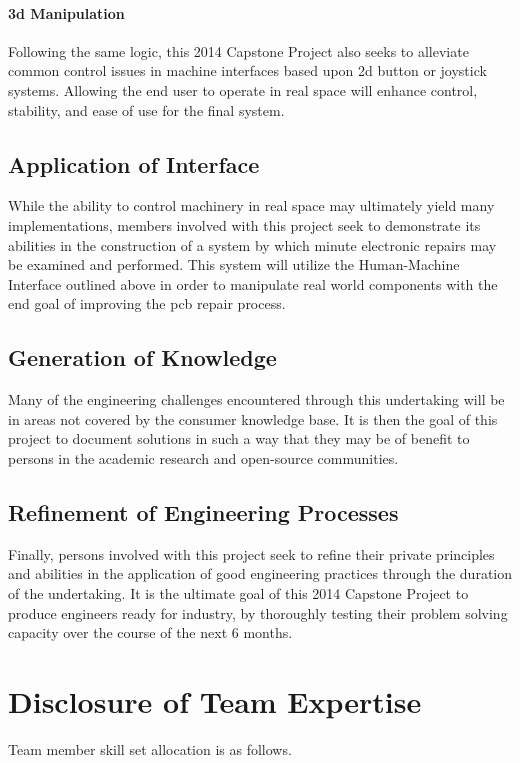 \paragraph{\gls{3d} Manipulation}
Following the same logic, this 2014 Capstone Project also seeks to alleviate common control issues in machine interfaces based upon \gls{2d} button or joystick systems.
Allowing the end user to operate in real space will enhance control, stability, and ease of use for the final system.

\subsection{Application of Interface}
While the ability to control machinery in real space may ultimately yield many implementations, members involved with this project seek to demonstrate its abilities in the construction of a system by which minute electronic repairs may be examined and performed.
This system will utilize the Human-Machine Interface outlined above in order to manipulate real world components with the end goal of improving the \gls{pcb} repair process.

\subsection{Generation of Knowledge}
Many of the engineering challenges encountered through this undertaking will be in areas not covered by the consumer knowledge base.
It is then the goal of this project to document solutions in such a way that they may be of benefit to persons in the academic research and open-source communities.

\subsection{Refinement of Engineering Processes}
Finally, persons involved with this project seek to refine their private principles and abilities in the application of good engineering practices through the duration of the undertaking.
It is the ultimate goal of this 2014 Capstone Project to produce engineers ready for industry, by thoroughly testing their problem solving capacity over the course of the next 6 months.

\section{Disclosure of Team Expertise}
Team member skill set allocation is as follows.

